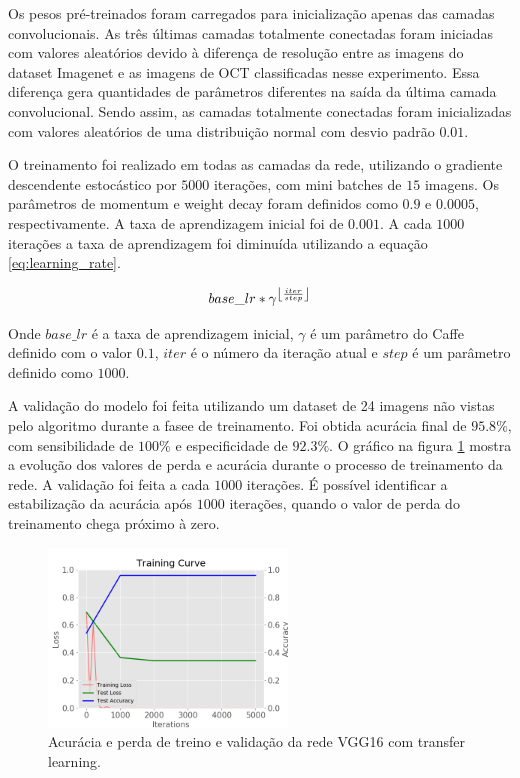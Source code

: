 \documentclass[conference]{IEEEtran}
\DeclarePairedDelimiter\floor{\lfloor}{\rfloor}
\begin{document}
  Os pesos pré-treinados foram carregados para inicialização apenas das camadas convolucionais. As três últimas camadas totalmente conectadas foram iniciadas com valores aleatórios devido à diferença de resolução entre as imagens do dataset Imagenet e as imagens de OCT classificadas nesse experimento. Essa diferença gera quantidades de parâmetros diferentes na saída da última camada convolucional. Sendo assim, as camadas totalmente conectadas foram inicializadas com valores aleatórios de uma distribuição normal com desvio padrão $0.01$.

  O treinamento foi realizado em todas as camadas da rede, utilizando o gradiente descendente estocástico por $5000$ iterações, com mini batches de $15$ imagens. Os parâmetros de momentum e weight decay foram definidos como $0.9$ e $0.0005$, respectivamente. A taxa de aprendizagem inicial foi de $0.001$. A cada $1000$ iterações a taxa de aprendizagem foi diminuída utilizando a equação \ref{eq:learning_rate}.

  \begin{equation}
    base\_lr * \gamma^{\floor*{\frac{iter}{step}}}
    \label{eq:learning_rate}
  \end{equation}

  Onde $base\_lr$ é a taxa de aprendizagem inicial, $\gamma$ é um parâmetro do Caffe definido com o valor $0.1$, $iter$ é o número da iteração atual e $step$ é um parâmetro definido como $1000$.

  A validação do modelo foi feita utilizando um dataset de 24 imagens não vistas pelo algoritmo durante a fasee de treinamento. Foi obtida acurácia final de $95.8\%$, com sensibilidade de $100\%$ e especificidade de $92.3\%$. O gráfico na figura \ref{fig:acuracia_vgg16_transfer} mostra a evolução dos valores de perda e acurácia durante o processo de treinamento da rede. A validação foi feita a cada $1000$ iterações. É possível identificar a estabilização da acurácia após $1000$ iterações, quando o valor de perda do treinamento chega próximo à zero.

  \begin{figure}[!tp]
    \centering
    \includegraphics[width=2.5in]{img/curve_vgg16.png}
    \caption{Acurácia e perda de treino e validação da rede VGG16 com transfer learning.}
    \label{fig:acuracia_vgg16_transfer}
  \end{figure}
\end{document}
